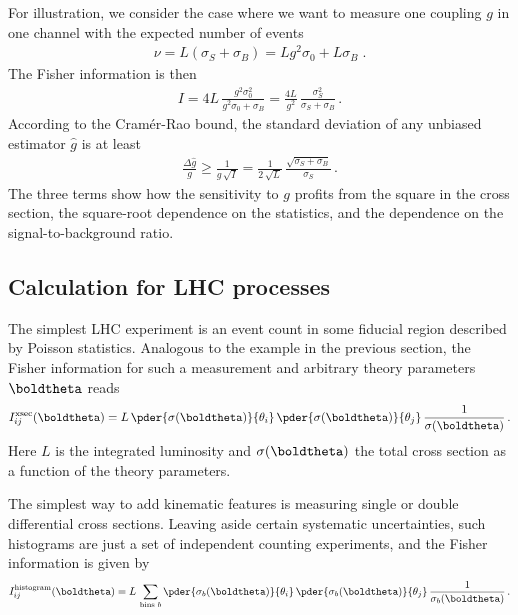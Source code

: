 For illustration, we consider the case where we want to
measure one coupling $g$ in one channel with the expected number of
events
%
\begin{align}
\nu = L \left( \sigma_S + \sigma_B \right) 
    = L g^2 \sigma_0 + L \sigma_B \; .
\end{align}
The Fisher information is then
%
\begin{align}
I = 4 L \, \frac {g^2 \sigma_0^2 } {g^2 \sigma_0 + \sigma_B} 
  = \frac{4 L}{g^2} \, \frac {\sigma_S^2 } {\sigma_S + \sigma_B} \, .
\end{align}
%
According to the Cram\'er-Rao bound, the standard deviation of any
unbiased estimator $\hat{g}$ is at least
%
\begin{align}
\frac{\Delta \hat{g}}{g} \geq \frac 1 {g \, \sqrt{I}} = 
\frac{1}{2 \, \sqrt{L}} \, \frac {\sqrt{\sigma_S +\sigma_B}} {\sigma_S} \,.
\end{align}
%
The three terms show how the sensitivity to $g$ profits from the
square in the cross section, the square-root dependence on the
statistics, and the dependence on the signal-to-background ratio.



\subsection{Calculation for LHC processes}
\label{sec:information_formalism_lhc}

The simplest LHC experiment is an event count in some fiducial region
described by Poisson statistics. Analogous to the example in the
previous section, the Fisher information for such a measurement and
arbitrary theory parameters $\boldtheta$ reads
%
\begin{equation}
  I^{\text{xsec}}_{ij} (\boldtheta) = L \, \pder {\sigma (\boldtheta)} {\theta_i}  \, \pder {\sigma (\boldtheta)} {\theta_j} \, \frac 1 {\sigma (\boldtheta)}\,.
\end{equation}
%
Here $L$ is the integrated luminosity and $\sigma(\boldtheta)$ the total
cross section as a function of the theory parameters.

The simplest way to add kinematic features is measuring single or
double differential cross sections. Leaving aside certain systematic
uncertainties, such histograms are just a set of independent counting
experiments, and the Fisher information is given by 
%
\begin{equation}
  I_{ij}^{\text{histogram}} (\boldtheta)  = L \, \sum_{\text{bins } b}
  \pder {\sigma_b (\boldtheta)} {\theta_i}  \, \pder {\sigma_b (\boldtheta)} {\theta_j} \, \frac 1 {\sigma_b (\boldtheta)}\,.
  \label{eq:information_histo}
\end{equation}

